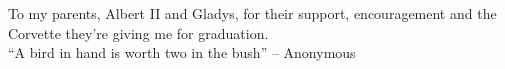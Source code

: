 

\begin{dedication}
   To my parents, Albert II and Gladys, for their support,
   encouragement and the Corvette they're giving me for graduation. \\[3ex]
   ``A bird in hand is worth two in the bush''
         -- Anonymous
\end{dedication}